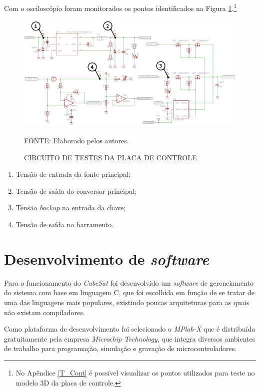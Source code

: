 \documentclass[
	12pt,				%
	openright,			%
	oneside,			%
	a4paper,			%
	english,			%
	french,				%
	spanish,			%
	brazil,				%
	oldfontcommands
	]{abntex2}
\begin{document}
	Com o osciloscópio foram monitorados os pontos identificados na Figura \ref{Fig_circ_test_cont}.\footnote{No Apêndice \ref{T_Cont} é possível visualizar os pontos utilizados para teste no modelo 3D da placa de controle.}
	
	\begin{figure}[th]
		\caption{CIRCUITO DE TESTES DA PLACA DE CONTROLE}
		\label{Fig_circ_test_cont}
		\centering
		\includegraphics[width=1\linewidth]{./figs/circ_test_cont}
			
		\begin{small}
			FONTE: Elaborado pelos autores.
		\end{small}
	\end{figure}
	
	\begin{enumerate}
		\item Tensão de entrada da fonte principal;
		\item Tensão de saída do conversor principal;
		\item Tensão \textit{backup} na entrada da chave;
		\item Tensão de saída no barramento.
	\end{enumerate}
	
\section[Desenvolvimento de software]{Desenvolvimento de \textit{software}}

	Para o funcionamento do \textit{CubeSat} foi desenvolvido um \textit{software} de gerenciamento do sistema com base em linguagem C, que foi escolhida em função de se tratar de uma das linguagens mais populares, existindo poucas arquiteturas para as quais não existam compiladores. 
	
	Como plataforma de desenvolvimento foi selecionado o \textit{MPlab-X} que é distribuída gratuitamente pela empresa \textit{Microchip Technology}, que integra diversos ambientes de trabalho para programação, simulação e gravação de microcontroladores. 
	
\end{document}
